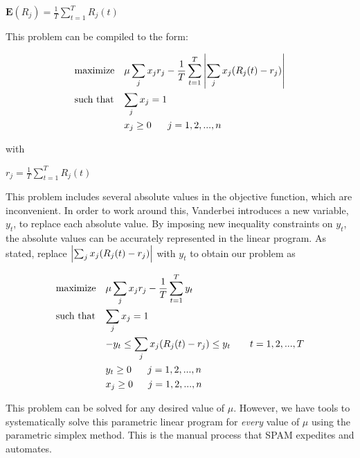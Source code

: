 \documentclass{article}
\begin{document}
\begin{center}
    $\mathbf{E}(R_j) = \frac{1}{T}\sum_{t=1}^{T} R_j(t)$
\end{center}

This problem can be compiled to the form:

\begin{align*}
&\text{maximize}  &&\text{$\mu\sum_{j} x_jr_j - \frac{1}{T}\sum_{t=1}^{T}\abs{\sum_{j} x_j(R_j(t)-r_j)}$}\\
&\text{such that}  &&\text{$\sum_{j} x_j = 1$}\\
&\text{}  &&\text{$x_j \geq 0$ \hspace{10pt} $j = 1,2,...,n$}
\end{align*}

with

\vspace{5pt}
\begin{center}
    $r_j = \frac{1}{T}\sum_{t=1}^{T} R_j(t)$
\end{center}
\vspace{5pt}

This problem includes several absolute values in the objective function, which are inconvenient. In order to work around this, Vanderbei introduces a new variable, $y_t$, to replace each absolute value. By imposing new inequality constraints on $y_t$, the absolute values can be accurately represented in the linear program. As stated, replace $\abs{\sum_{j} x_j(R_j(t)-r_j)}$ with $y_t$ to obtain our problem as

\begin{align*}
&\text{maximize}  &&\text{$\mu\sum_{j} x_jr_j - \frac{1}{T}\sum_{t=1}^{T} y_t$}\\
&\text{such that}  &&\text{$\sum_{j} x_j = 1$}\\
&\text{}  &&\text{$-y_t \leq \sum_{j} x_j(R_j(t)-r_j) \leq y_t \hspace{20pt} t = 1,2,...,T$}\\
&\text{}  &&\text{$y_t \geq 0$ \hspace{10pt} $j = 1,2,...,n$}\\
&\text{}  &&\text{$x_j \geq 0$ \hspace{9pt} $j = 1,2,...,n$}
\end{align*}

This problem can be solved for any desired value of $\mu$. However, we have tools to systematically solve this parametric linear program for \textit{every} value of $\mu$ using the parametric simplex method. This is the manual process that SPAM expedites and automates.
\end{document}
